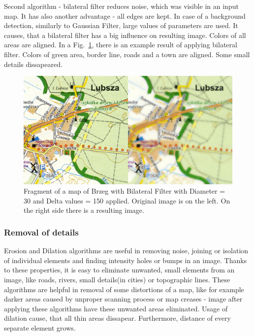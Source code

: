 \documentclass[a4paper,onecolumn,oneside,12pt]{memoir}
\begin{document}
Second algorithm - bilateral filter reduces noise, which was visible in an input map. It has also
another advantage - all edges are kept. In case of a background detection, similarly to Gaussian
Filter, large values of parameters are used. It causes, that a bilateral filter has a big influence
on resulting image. Colors of all areas are aligned. In a Fig.~\ref{bilateralFilterResult}, there is
an example result of applying bilateral filter. Colors of green area, border line, roads and a town
are aligned. Some small details dissapeared.

\begin{figure}[!ht]
\begin{center}
\includegraphics[scale=1.5]{images/BilateralFilterResult.jpg}
\caption{Fragment of a map of Brzeg with Bilateral Filter with Diameter = 30 and Delta values = 150
applied. Original image is on the left. On the right side there is a resulting image.}
\label{bilateralFilterResult}
\end{center}
\end{figure}

\subsubsection{Removal of details}

Erosion and Dilation algorithms are useful in removing noise, joining or isolation of individual
elements and finding intensity holes or bumps in an image. Thanks to these properties, it is easy
to eliminate unwanted, small elements from an image, like roads, rivers, small details(in cities) or
topographic lines. These algorithms are helpful in removal of some distortions of a map, like for
example darker areas caused by unproper scanning process or map creases - image after applying these
algorithms have these unwanted areas eliminated. Usage of dilation cause, that all thin areas
dissapear. Furthermore, distance of every separate element grows.
\end{document}
